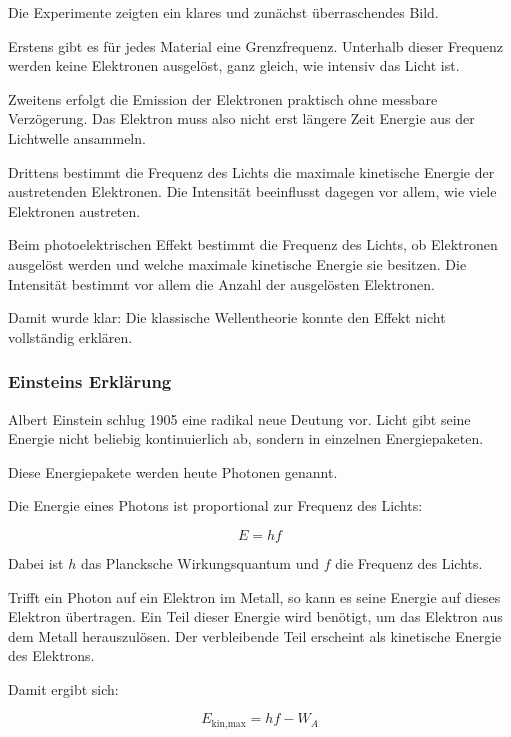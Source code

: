 Die Experimente zeigten ein klares und zunächst überraschendes Bild.

Erstens gibt es für jedes Material eine Grenzfrequenz.
Unterhalb dieser Frequenz werden keine Elektronen ausgelöst,
ganz gleich, wie intensiv das Licht ist.

Zweitens erfolgt die Emission der Elektronen praktisch ohne messbare
Verzögerung. Das Elektron muss also nicht erst längere Zeit Energie
aus der Lichtwelle ansammeln.

Drittens bestimmt die Frequenz des Lichts die maximale kinetische Energie
der austretenden Elektronen. Die Intensität beeinflusst dagegen vor allem,
wie viele Elektronen austreten.

\begin{PhysicsBox}
	\label{box:zentrale-beobachtung-photoeffekt}
	Beim photoelektrischen Effekt bestimmt die Frequenz des Lichts,
	ob Elektronen ausgelöst werden und welche maximale kinetische Energie
	sie besitzen. Die Intensität bestimmt vor allem die Anzahl der ausgelösten
	Elektronen.
\end{PhysicsBox}

Damit wurde klar:
Die klassische Wellentheorie konnte den Effekt nicht vollständig erklären.

\subsubsection{Einsteins Erklärung}

Albert Einstein schlug 1905 eine radikal neue Deutung vor.
Licht gibt seine Energie nicht beliebig kontinuierlich ab,
sondern in einzelnen Energiepaketen.

Diese Energiepakete werden heute Photonen genannt.

Die Energie eines Photons ist proportional zur Frequenz des Lichts:

\[
E = h f
\]

Dabei ist \(h\) das Plancksche Wirkungsquantum
und \(f\) die Frequenz des Lichts.

Trifft ein Photon auf ein Elektron im Metall, so kann es seine Energie
auf dieses Elektron übertragen. Ein Teil dieser Energie wird benötigt,
um das Elektron aus dem Metall herauszulösen. Der verbleibende Teil
erscheint als kinetische Energie des Elektrons.

Damit ergibt sich:

\[
E_{\text{kin,max}} = h f - W_A
\]

